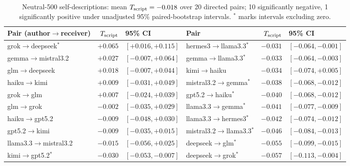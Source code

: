 \begin{table}[H]
\centering\scriptsize
\begin{tabular}{lrl@{\qquad}lrl}
\toprule
Pair (author$\to$receiver) & $T_{\mathrm{script}}$ & 95\% CI & Pair & $T_{\mathrm{script}}$ & 95\% CI \\
\midrule
grok$\to$deepseek$^{*}$ & $+0.065$ & $[+0.016,+0.115]$ & hermes3$\to$llama3.3$^{*}$ & $-0.031$ & $[-0.064,-0.001]$ \\
gemma$\to$mistral3.2 & $+0.027$ & $[-0.007,+0.064]$ & gemma$\to$llama3.3$^{*}$ & $-0.033$ & $[-0.064,-0.003]$ \\
glm$\to$deepseek & $+0.018$ & $[-0.007,+0.044]$ & kimi$\to$haiku & $-0.034$ & $[-0.074,+0.005]$ \\
haiku$\to$kimi & $+0.009$ & $[-0.031,+0.049]$ & mistral3.2$\to$gemma$^{*}$ & $-0.038$ & $[-0.068,-0.012]$ \\
grok$\to$glm & $+0.007$ & $[-0.024,+0.039]$ & gpt5.2$\to$haiku$^{*}$ & $-0.040$ & $[-0.068,-0.012]$ \\
glm$\to$grok & $-0.002$ & $[-0.035,+0.029]$ & llama3.3$\to$gemma$^{*}$ & $-0.041$ & $[-0.077,-0.009]$ \\
haiku$\to$gpt5.2 & $-0.009$ & $[-0.048,+0.030]$ & llama3.3$\to$hermes3$^{*}$ & $-0.042$ & $[-0.074,-0.012]$ \\
gpt5.2$\to$kimi & $-0.009$ & $[-0.035,+0.015]$ & mistral3.2$\to$llama3.3$^{*}$ & $-0.046$ & $[-0.084,-0.013]$ \\
llama3.3$\to$mistral3.2 & $-0.015$ & $[-0.056,+0.025]$ & deepseek$\to$glm$^{*}$ & $-0.055$ & $[-0.099,-0.015]$ \\
kimi$\to$gpt5.2$^{*}$ & $-0.030$ & $[-0.053,-0.007]$ & deepseek$\to$grok$^{*}$ & $-0.057$ & $[-0.113,-0.004]$ \\
\bottomrule
\end{tabular}
\caption{Neutral-500 self-descriptions: mean $T_{\mathrm{script}} = -0.018$ over 20 directed pairs; 10 significantly negative, 1 significantly positive under unadjusted 95\% paired-bootstrap intervals. $^{*}$ marks intervals excluding zero.}
\label{tab:native-pairs}
\end{table}
